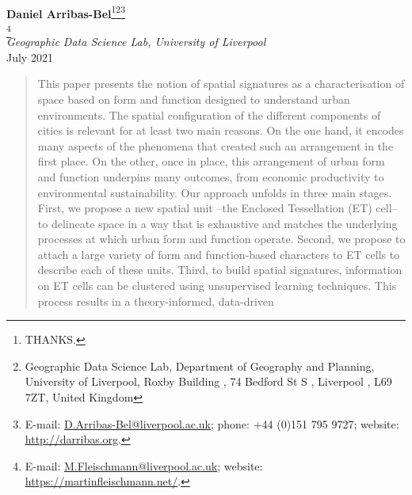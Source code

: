 \documentclass[pdftex,letterpaper,11pt]{article}%
\begin{document}
\begin{titlepage}
\vspace*{1ex}
\begin{minipage}{\textwidth}
\begin{center}%

    {}\\[4ex]%


{\Large\textbf{Daniel Arribas-Bel}\footnote[1]{THANKS.}\footnote[2]{Geographic
Data Science Lab, Department of Geography and Planning, University of
Liverpool, Roxby Building , 74 Bedford St S , Liverpool , L69 7ZT, United
Kingdom}\footnote[3]{E-mail: \url{D.Arribas-Bel@liverpool.ac.uk}; phone: +44 (0)151 795 9727; website: \url{http://darribas.org}.
}}\\[1mm]
%
{\Large{}\footnotemark[1]\footnotemark[2]\footnote[4]{
E-mail: \url{M.Fleischmann@liverpool.ac.uk}; website: \url{https://martinfleischmann.net/}.}}\\[1mm]
{\large\textit{Geographic Data Science Lab, University of Liverpool} }\\[2.5ex]
%
July 2021\vspace{1.5ex}
%
\end{center}
%
\begin{abstract}
        This paper presents the notion of spatial signatures as a
        characterisation of space based on form and function designed to
        understand urban environments.
The spatial configuration of the different components of cities is relevant
for at least two main reasons.
%
On
the one hand, it encodes many aspects of the phenomena
that created such an arrangement in the first place. On the other, once in
place, this arrangement of urban form and function underpins many
outcomes, from economic productivity to environmental sustainability.
Our approach unfolds in three main stages.
First, we propose a new spatial unit --the Enclosed Tessellation (ET) cell-- to
delineate space in a way that is exhaustive and matches the underlying
processes at which urban form and function operate.
Second, we propose to attach a large variety of form and function-based
characters to ET cells to describe each of these units.
Third, to build spatial signatures, information on ET cells can be clustered
using unsupervised learning techniques.
This process results in a theory-informed, data-driven

\end{abstract}
\end{minipage}
\end{titlepage}
\end{document}
